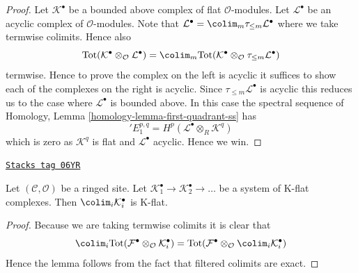 \begin{proof}
Let $\mathcal{K}^\bullet$ be a bounded above complex of flat
$\mathcal{O}$-modules. Let $\mathcal{L}^\bullet$ be an acyclic complex
of $\mathcal{O}$-modules. Note that
$\mathcal{L}^\bullet = \colim_m \tau_{\leq m}\mathcal{L}^\bullet$
where we take termwise colimits. Hence also
$$
\text{Tot}(\mathcal{K}^\bullet \otimes_\mathcal{O} \mathcal{L}^\bullet)
=
\colim_m \text{Tot}(
\mathcal{K}^\bullet \otimes_\mathcal{O} \tau_{\leq m}\mathcal{L}^\bullet)
$$
termwise. Hence to prove the complex on the left is acyclic it suffices
to show each of the complexes on the right is acyclic. Since
$\tau_{\leq m}\mathcal{L}^\bullet$ is acyclic this reduces us to the
case where $\mathcal{L}^\bullet$ is bounded above.
In this case the spectral sequence of
Homology, Lemma \ref{homology-lemma-first-quadrant-ss}
has
$$
{}'E_1^{p, q} = H^p(\mathcal{L}^\bullet \otimes_R \mathcal{K}^q)
$$
which is zero as $\mathcal{K}^q$ is flat and $\mathcal{L}^\bullet$ acyclic.
Hence we win.
\end{proof}

\begin{lemma}
\label{sites-cohomology-lemma-colimit-K-flat}
\href{https://stacks.math.columbia.edu/tag/06YR}{\texttt{Stacks tag 06YR}}

Let $(\mathcal{C}, \mathcal{O})$ be a ringed site.
Let $\mathcal{K}_1^\bullet \to \mathcal{K}_2^\bullet \to \ldots$
be a system of K-flat complexes.
Then $\colim_i \mathcal{K}_i^\bullet$ is K-flat.
\end{lemma}

\begin{proof}
Because we are taking termwise colimits it is clear that
$$
\colim_i \text{Tot}(
\mathcal{F}^\bullet \otimes_\mathcal{O} \mathcal{K}_i^\bullet)
=
\text{Tot}(\mathcal{F}^\bullet \otimes_\mathcal{O}
\colim_i \mathcal{K}_i^\bullet)
$$
Hence the lemma follows from the fact that filtered colimits are
exact.
\end{proof}

